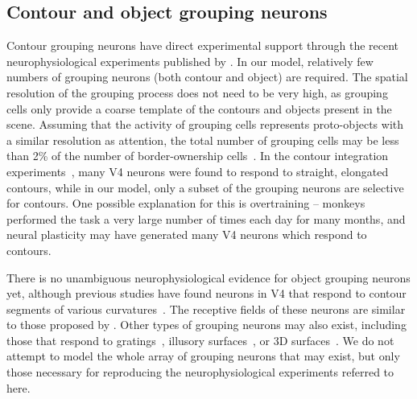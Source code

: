 \subsection{Contour and object grouping neurons}

Contour grouping neurons have direct experimental support through the
recent neurophysiological experiments published by \cite{Chen_etal14}.
In our model, relatively few numbers of grouping neurons (both contour
and object) are required. The spatial resolution of the grouping
process does not need to be very high, as grouping cells only provide
a coarse template of the contours and objects present in the scene. Assuming that the activity of grouping cells represents proto-objects with a similar resolution as attention, the total number of grouping cells may be less than 2\% of the number of border-ownership cells~\citep{Craft_etal07}. In the contour integration experiments~\citep{Chen_etal14}, many V4 neurons were found to respond to straight, elongated contours, while in our model, only a subset of the grouping neurons are selective for contours. One possible explanation for this is overtraining -- monkeys performed the task a very large number of times each day for many months, and neural plasticity may have generated many V4 neurons which respond to contours. 

There is no unambiguous neurophysiological evidence for object grouping
neurons yet, although previous studies have found neurons in V4 that
respond to contour segments of various curvatures~\citep{Pasupathy_Connor02,Brincat_Connor04}. The receptive
fields of these neurons are similar to those proposed by \cite{Craft_etal07}. Other types of grouping neurons may also exist,
including those that respond to gratings~\citep{Hegde_vanEssen07},
illusory surfaces~\citep{Cox_etal13}, or 3D surfaces~\citep{He_Nakayama95,Hu_etal15a}. We do not attempt to model
the whole array of grouping neurons that may exist, but only those
necessary for reproducing the neurophysiological experiments referred
to here.

